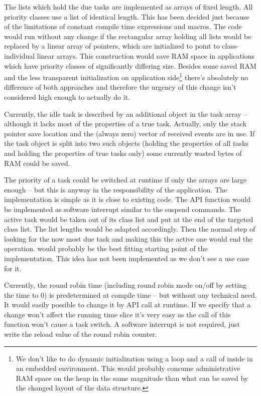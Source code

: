 The lists which hold the due tasks are implemented as arrays of fixed
length. All priority classes use a list of identical length. This has been
decided just because of the limitations of constant compile time
expressions and macros. The code would run without any change if the
rectangular array holding all lists would be replaced by a linear array of
pointers, which are initialized to point to class-individual linear
arrays. This construction would save RAM space in applications which have
priority classes of significantly differing size. Besides some saved RAM
and the less transparent initialization on application side\footnote{We
don't like to do dynamic initialization using a loop and a call of
 inside in an embedded environment. This would probably
consume administrative RAM space on the heap in the same magnitude than
what can be saved by the changed layout of the \rtos{} data structure.}
there's absolutely no difference of both approaches and therefore the
urgency of this change isn't considered high enough to actually do it.

Currently, the idle task is described by an additional object in the task
array -- although it lacks most of the properties of a true task.
Actually, only the stack pointer save location and the (always zero)
vector of received events are in use. If the task object is split into two
such objects (holding the properties of all tasks and holding the
properties of true tasks only) some currently wasted bytes of RAM could be
saved.

The priority of a task could be switched at runtime if only the arrays are
large enough -- but this is anyway in the responsibility of the
application. The implementation is simple as it is close to existing code.
The API function would be implemented as software interrupt similar to the
suspend commands. The active task would be taken out of its class list and
put at the end of the targeted class list. The list lengths would be
adapted accordingly. Then the normal step of looking for the now most due
task and making this the active one would end the operation.
 would probably be the best fitting starting point
of the implementation. This idea has not been implemented as we don't see
a use case for it.

Currently, the round robin time (including round robin mode on/off by
setting the time to 0) is predetermined at compile time -- but without any
technical need. It would easily possible to change it by API call at
runtime. If we specify that a change won't affect the running time slice
it's very easy as the call of this function won't cause a task switch. A
software interrupt is not required, just write the reload value of the
round robin counter.

